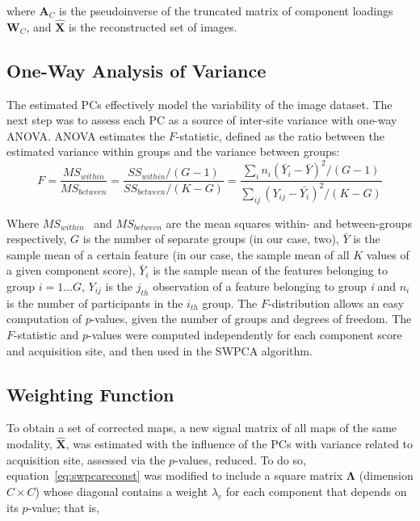 where  $\mathbf{A}_C$ is the pseudoinverse of the truncated matrix of
component loadings  $\mathbf{W}_C$, and  $\hat{\mathbf{X}}$ is the
reconstructed set of images.

\subsection{One-Way Analysis of Variance}
The estimated PCs effectively model the variability of the image dataset. The next step was to assess each PC as a source of inter-site variance with one-way \acf{ANOVA}. \ac{ANOVA} estimates the $F$-statistic, defined as the ratio between the estimated variance within groups and the variance between groups:
\begin{equation}
F=\frac{M{S}_{\mathit{within}}}{M{S}_{\mathit{between}}}=\frac{S{S}_{\mathit{within}}/(G-1)}{S{S}_{\mathit{between}}/(K-G)}=\frac{\sum
	_{i}{{n}_{i}{\left({\bar{{Y}}}_{i}-\bar{{Y}}\right)}^{2}/{\left(G-1\right)}}}{\sum
	_{\mathit{ij}}{{\left({Y}_{\mathit{ij}}-\bar{{{Y}_{i}}}\right)}^{2}/{\left(K-G\right)}}}
\end{equation}

Where  $M{S}_{\mathit{within}}$ \ and  $M{S}_{\mathit{between}}$ are the mean squares within- and between-groups respectively, $G$ is the number of separate groups (in our case, two),  $\bar{Y}$ is the sample mean of a certain feature (in our case, the sample mean of all $K$ values of a given component score),  ${\bar{Y}}_{i}$ is the sample mean of the features belonging to group $i=1\dots G$, ${Y}_{\mathit{ij}}$ is the $j_{th}$ observation of a feature belonging to group \textit{i} and  ${n}_{i}$ is the number of participants in the  $i_{th}$ group. The $F$-distribution allows an easy computation of $p$-values, given the number of groups and degrees of freedom. The $F$-statistic and $p$-values were computed independently for each component score and acquisition site, and then used in the \ac{SWPCA} algorithm.

\subsection{Weighting Function}
To obtain a set of corrected maps, a new signal matrix of all maps of the same modality,  $\widehat{\mathbf{X}}$, was estimated with the influence of the PCs with variance related to acquisition site, assessed via the $p$-values, reduced. To do so, equation~\ref{eq:swpcareconst} was modified to include a square matrix $\boldsymbol\Lambda$ (dimension $C\times C$) whose diagonal contains a weight ${\lambda }_{c}$ for each component that depends on its $p$-value; that is,

